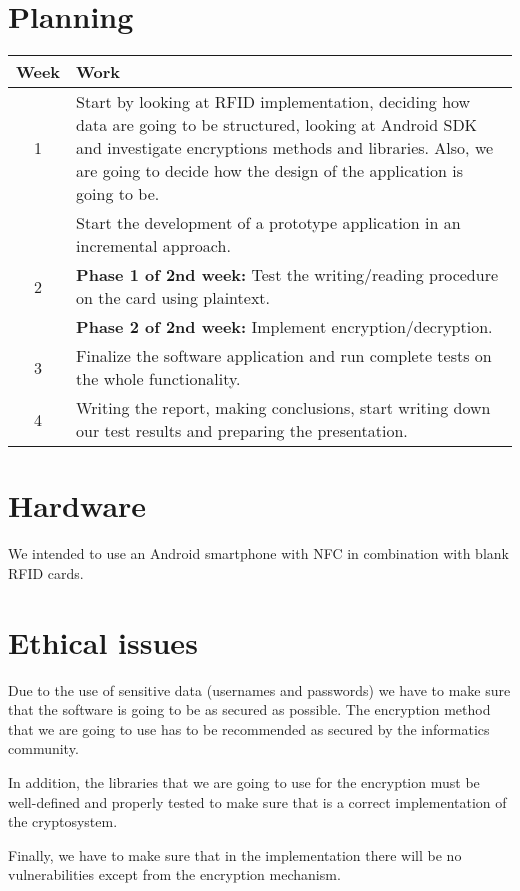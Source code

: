 \documentclass[11pt]{article}
\begin{document}
\section{Planning}

\begin{center}
\begin{tabular}{ | c | m{11cm}|  } 
\hline
Week & Work \\ 
\hline
1 & Start by looking at RFID implementation, deciding how data are going to be structured, looking at Android SDK and investigate encryptions methods and libraries. Also, we are going to decide how the design of the application is going to be. \\ 
\hline
& Start the development of a prototype application in an incremental approach.\\
2 & \textbf{Phase 1 of 2nd week:} Test the writing/reading procedure on the card using plaintext.\\
& \textbf{Phase 2 of 2nd week:} Implement encryption/decryption.\\ 
\hline
3 & Finalize the software application and run complete tests on the whole functionality.\\ 
\hline
4 & Writing the report, making conclusions, start writing down our test results and preparing the presentation. \\
\hline
\end{tabular}
\end{center}

\clearpage

\section{Hardware}
We intended to use an Android smartphone with NFC in combination with blank RFID cards. 

\section{Ethical issues}
Due to the use of sensitive data (usernames and passwords) we have to make sure that the software is going to be as secured as possible. The encryption method that we are going to use has to be recommended as secured by the informatics community.

In addition, the libraries that we are going to use for the encryption must be well-defined and properly tested to make sure that is a correct implementation of the cryptosystem.

Finally, we have to make sure that in the implementation there will be no vulnerabilities except from the encryption mechanism.


\end{document}

